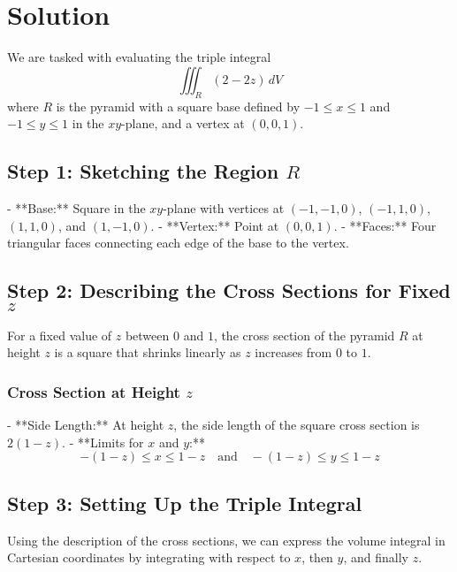 \documentclass[11pt]{article}
\begin{document}
\newpage

\section{Solution}

We are tasked with evaluating the triple integral
\[
\iiint_{R} (2 - 2z) \, dV
\]
where \( R \) is the pyramid with a square base defined by \( -1 \leq x \leq 1 \) and \( -1 \leq y \leq 1 \) in the \( xy \)-plane, and a vertex at \( (0, 0, 1) \).

\newpage

\subsection{Step 1: Sketching the Region \( R \)}

- **Base:** Square in the \( xy \)-plane with vertices at \( (-1, -1, 0) \), \( (-1, 1, 0) \), \( (1, 1, 0) \), and \( (1, -1, 0) \).
- **Vertex:** Point at \( (0, 0, 1) \).
- **Faces:** Four triangular faces connecting each edge of the base to the vertex.

\newpage

\subsection{Step 2: Describing the Cross Sections for Fixed \( z \)}

For a fixed value of \( z \) between \( 0 \) and \( 1 \), the cross section of the pyramid \( R \) at height \( z \) is a square that shrinks linearly as \( z \) increases from \( 0 \) to \( 1 \).

\subsubsection{Cross Section at Height \( z \)}
- **Side Length:** At height \( z \), the side length of the square cross section is \( 2(1 - z) \).
- **Limits for \( x \) and \( y \):**
  \[
  - (1 - z) \leq x \leq 1 - z \quad \text{and} \quad - (1 - z) \leq y \leq 1 - z
  \]

\newpage

\subsection{Step 3: Setting Up the Triple Integral}

Using the description of the cross sections, we can express the volume integral in Cartesian coordinates by integrating with respect to \( x \), then \( y \), and finally \( z \).
\end{document}

